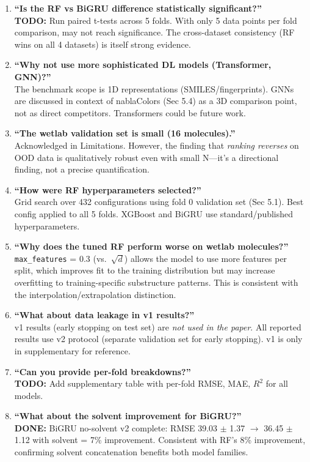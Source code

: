 \documentclass[11pt,a4paper]{article}
\newcommand{\TODO}[1]{\textcolor{todo}{\textbf{TODO:} #1}}
\newcommand{\DONE}[1]{\textcolor{done}{\textbf{DONE:} #1}}
\begin{document}
\begin{enumerate}[leftmargin=*]
    \item \textbf{``Is the RF vs BiGRU difference statistically significant?''}\\
    \TODO{Run paired t-tests across 5 folds. With only 5 data points per fold comparison, may not reach significance.} The cross-dataset consistency (RF wins on all 4 datasets) is itself strong evidence.

    \item \textbf{``Why not use more sophisticated DL models (Transformer, GNN)?''}\\
    The benchmark scope is 1D representations (SMILES/fingerprints). GNNs are discussed in context of nablaColors (Sec 5.4) as a 3D comparison point, not as direct competitors. Transformers could be future work.

    \item \textbf{``The wetlab validation set is small (16 molecules).''}\\
    Acknowledged in Limitations. However, the finding that \textit{ranking reverses} on OOD data is qualitatively robust even with small N---it's a directional finding, not a precise quantification.

    \item \textbf{``How were RF hyperparameters selected?''}\\
    Grid search over 432 configurations using fold 0 validation set (Sec 5.1). Best config applied to all 5 folds. XGBoost and BiGRU use standard/published hyperparameters.

    \item \textbf{``Why does the tuned RF perform worse on wetlab molecules?''}\\
    \texttt{max\_features} = 0.3 (vs.\ $\sqrt{d}$) allows the model to use more features per split, which improves fit to the training distribution but may increase overfitting to training-specific substructure patterns. This is consistent with the interpolation/extrapolation distinction.

    \item \textbf{``What about data leakage in v1 results?''}\\
    v1 results (early stopping on test set) are \textit{not used in the paper}. All reported results use v2 protocol (separate validation set for early stopping). v1 is only in supplementary for reference.

    \item \textbf{``Can you provide per-fold breakdowns?''}\\
    \TODO{Add supplementary table with per-fold RMSE, MAE, $R^2$ for all models.}

    \item \textbf{``What about the solvent improvement for BiGRU?''}\\
    \DONE{BiGRU no-solvent v2 complete: RMSE 39.03 $\pm$ 1.37 $\to$ 36.45 $\pm$ 1.12 with solvent = 7\% improvement. Consistent with RF's 8\% improvement, confirming solvent concatenation benefits both model families.}
\end{enumerate}
\end{document}
